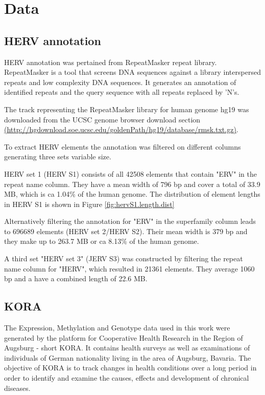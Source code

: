 \documentclass[a4paper,12pt]{article}
\begin{document}
\newpage
\section{Data}


\subsection{HERV annotation}
HERV annotation was pertained from RepeatMasker repeat library. RepeatMasker is a tool that screens DNA sequences against a library interspersed repeats and low complexity DNA sequences. It generates an annotation of identified repeats and the query sequence with all repeats replaced by 'N's.

The track representing the RepeatMasker library for human genome hg19 was downloaded from the UCSC genome browser download section \url{(http://hgdownload.soe.ucsc.edu/goldenPath/hg19/database/rmsk.txt.gz)}.

To extract HERV elements the annotation was filtered on different columns generating three sets variable size.

HERV set 1 (HERV S1) consists of all 42508 elements that contain "ERV" in the repeat name column. They have a mean width of 796 bp and cover a total of 33.9 MB, which is ca 1.04\% of the human genome. The distribution of element lengths in HERV S1 is shown in Figure \ref{fig:hervS1.length.dist}  

Alternatively filtering the annotation for "ERV" in the superfamily column leads to 696689 elements (HERV set 2/HERV S2). Their mean width is 379 bp and they make up to 263.7 MB or ca 8.13\% of the human genome. 

A third set "HERV set 3" (JERV S3) was constructed by filtering the repeat name column for "HERV", which resulted in 21361 elements. They average 1060 bp and a have a combined length of 22.6 MB.

\subsection{KORA}
The Expression, Methylation and Genotype data used in this work were generated by the platform for Cooperative Health Research in the Region of Augsburg - short KORA. It contains health surveys as well as examinations of individuals of German nationality living in the area of Augsburg, Bavaria.
The objective of KORA is to track changes in health conditions over a long period in order to identify and examine the causes, effects and development of chronical diseases.
\end{document}
